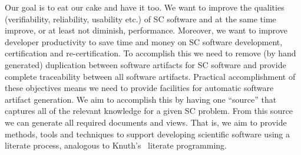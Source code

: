\documentclass{sig-alternate-05-2015}
\begin{document}


Our goal is to eat our cake and have it too.  We want to improve the qualities
(verifiability, reliability, usability etc.) of SC software and at the same time
improve, or at least not diminish, performance.  Moreover, we want to improve
developer productivity to save time and money on SC software development,
certification and re-certification.  To accomplish this we need to remove (by
hand generated) duplication between software artifacts for SC software
\cite{WilsonEtAl2013} and provide complete traceability between all software
artifacts.  Practical accomplishment of these objectives means we need to
provide facilities for automatic software artifact generation.  We aim to
accomplish this by having one ``source'' that captures all of the relevant
knowledge for a given SC problem.  From this source we can generate all required
documents and views.  That is, we aim to provide methods, tools and techniques
to support developing scientific software using a literate process, analogous
to Knuth's~\cite{Knuth1984} literate programming.
\end{document}
